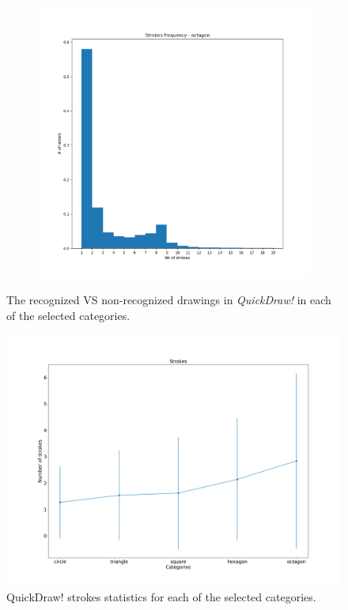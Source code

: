 \begin{figure}
\begin{subfigure}{0.3\textwidth}
    \end{subfigure}
    ~
    \begin{subfigure}{0.3\textwidth}
        \includegraphics[scale=0.28]{images/dataset/strokes_frequency_octagon.png}
    \end{subfigure}

    \caption{The recognized VS non-recognized drawings in \textit{QuickDraw!} in each of the selected categories.}
    \label{fig:stroke_count}
\end{figure}

\begin{figure}
    \centering
    \includegraphics[scale=0.4]{images/dataset/quickdraw_strokes.png}
    \caption{QuickDraw! strokes statistics for each of the selected categories.}
    \label{fig:quickdraw_strokes}
\end{figure}

